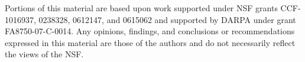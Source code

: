 \documentclass{sig-alternate}
\begin{document}
Portions of this material are based upon work 
supported under NSF grants CCF-1016937,  0238328,  0612147, and 0615062 and
supported by DARPA under grant FA8750-07-C-0014.
Any opinions, findings, and conclusions or recommendations
   expressed in this material are those of the authors and do not
   necessarily reflect the views of the NSF.


%


\end{document}

